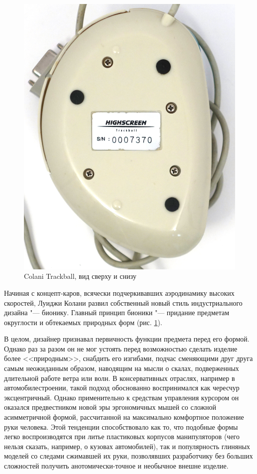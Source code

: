 \documentclass[11pt, a4paper]{article}
\begin{document}
\begin{figure}[h]
    \includegraphics[scale=0.39]{1993_colani_trackball/bottom_w_30.jpg}

    \caption{Colani Trackball, вид сверху и снизу}
    \label{fig:ColaniTopBottom}
\end{figure}

Начиная с концепт-каров, всячески подчеркивавших аэродинамику высоких скоростей, Луиджи Колани развил собственный новый стиль индустриального дизайна "--- бионику. Главный принцип бионики "--- придание предметам округлости и обтекаемых природных форм (рис. \ref{fig:ColaniTopBottom}).

В целом, дизайнер признавал первичность функции предмета перед его формой. Однако раз за разом он не мог устоять перед возможностью сделать изделие более <<природным>>, снабдить его изгибами, подчас сменяющими друг друга самым неожиданным образом, наводящим на мысли о скалах, подверженных длительной работе ветра или волн. В консервативных отраслях, например в автомобилестроении, такой подход обоснованно воспринимался как чересчур эксцентричный. Однако применительно к средствам управления курсором он оказался предвестником новой эры эргономичных мышей со сложной асимметричной формой, рассчитанной на максимально комфортное положение руки человека. Этой тенденции способствовало как то, что подобные формы легко воспроизводятся при литье пластиковых корпусов манипуляторов (чего нельзя сказать, например, о кузовах автомобилей), так и популярность глиняных моделей со следами сжимавшей их руки, позволявших разработчику без больших сложностей получить анотомически-точное и необычное внешне изделие.
\end{document}
